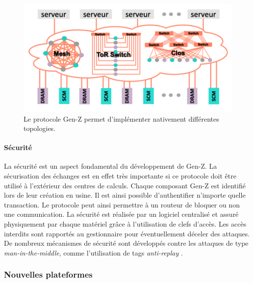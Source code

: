                \begin{figure}
                \center
                \includegraphics[width=14cm]{images/edl_genz_topo.png}
                \caption{\label{fig:edl_genz_topo} Le protocole Gen-Z permet d'implémenter nativement différentes topologies.}
            \end{figure}
            
            

    \paragraph{Sécurité}

        La sécurité est un aspect fondamental du développement de Gen-Z. La sécurisation des échanges est en effet très importante si ce protocole doit être utilisé à l'extérieur des centres de calculs. Chaque composant Gen-Z est identifié lors de leur création en usine. Il est ainsi possible d'authentifier n'importe quelle transaction. Le protocole peut ainsi permettre à un routeur de bloquer ou non une communication. La sécurité est réalisée par un logiciel centralisé et assuré physiquement par chaque matériel grâce à l’utilisation de clefs d’accès. Les accès interdits sont rapportés au gestionnaire pour éventuellement déceler des attaques. De nombreux mécanismes de sécurité sont développés contre les attaques de type \textit{man-in-the-middle}, comme l'utilisation de tags \textit{anti-replay} \cite{Radhakishan2011}.

    \subsubsection{Nouvelles plateformes} \label{sec:oppo_new_tech} \label{sec:compute_on_the_edge}
            
